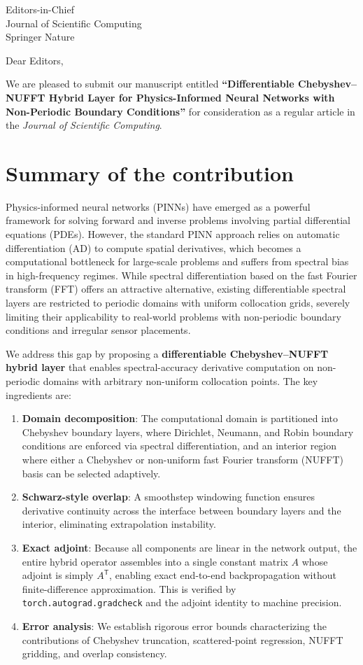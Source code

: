\documentclass[12pt]{letter}
\date{\today}
\begin{document}
\begin{letter}{
  Editors-in-Chief\\
  Journal of Scientific Computing\\
  Springer Nature
}

\opening{Dear Editors,}

We are pleased to submit our manuscript entitled \textbf{``Differentiable Chebyshev--NUFFT Hybrid Layer for Physics-Informed Neural Networks with Non-Periodic Boundary Conditions''} for consideration as a regular article in the \textit{Journal of Scientific Computing}.

\section*{Summary of the contribution}

Physics-informed neural networks (PINNs) have emerged as a powerful framework for solving forward and inverse problems involving partial differential equations (PDEs). However, the standard PINN approach relies on automatic differentiation (AD) to compute spatial derivatives, which becomes a computational bottleneck for large-scale problems and suffers from spectral bias in high-frequency regimes. While spectral differentiation based on the fast Fourier transform (FFT) offers an attractive alternative, existing differentiable spectral layers are restricted to periodic domains with uniform collocation grids, severely limiting their applicability to real-world problems with non-periodic boundary conditions and irregular sensor placements.

We address this gap by proposing a \textbf{differentiable Chebyshev--NUFFT hybrid layer} that enables spectral-accuracy derivative computation on non-periodic domains with arbitrary non-uniform collocation points. The key ingredients are:

\begin{enumerate}
  \item \textbf{Domain decomposition}: The computational domain is partitioned into Chebyshev boundary layers, where Dirichlet, Neumann, and Robin boundary conditions are enforced via spectral differentiation, and an interior region where either a Chebyshev or non-uniform fast Fourier transform (NUFFT) basis can be selected adaptively.
  \item \textbf{Schwarz-style overlap}: A smoothstep windowing function ensures derivative continuity across the interface between boundary layers and the interior, eliminating extrapolation instability.
  \item \textbf{Exact adjoint}: Because all components are linear in the network output, the entire hybrid operator assembles into a single constant matrix $A$ whose adjoint is simply $A^\mathsf{T}$, enabling exact end-to-end backpropagation without finite-difference approximation. This is verified by \texttt{torch.autograd.gradcheck} and the adjoint identity to machine precision.
  \item \textbf{Error analysis}: We establish rigorous error bounds characterizing the contributions of Chebyshev truncation, scattered-point regression, NUFFT gridding, and overlap consistency.
\end{enumerate}


\end{letter}
\end{document}

